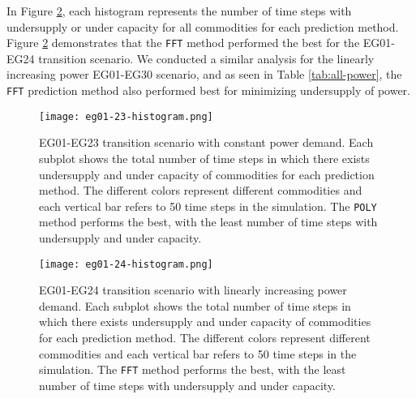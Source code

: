 In Figure \ref{fig:eg24under}, each histogram represents 
the number of time steps with undersupply or 
under capacity for all commodities for each prediction method.  
Figure \ref{fig:eg24under} demonstrates that the \texttt{FFT} method 
performed the best for the EG01-EG24 transition scenario.
We conducted a similar analysis for the linearly increasing power 
EG01-EG30 scenario, and 
as seen in Table \ref{tab:all-power}, the \texttt{FFT} prediction method 
also performed best for minimizing undersupply of power. 

\begin{figure}[]
	\centering
	\texttt{[image: eg01-23-histogram.png]} 
	\caption{
	EG01-EG23 transition scenario with constant power demand. 
	Each subplot shows the total number of time steps in which there exists 
	undersupply and under capacity of commodities for each prediction method. 
	The different colors represent different commodities and each vertical bar refers 
	to 50 time steps in the simulation.
	The \texttt{POLY} method performs the best, with the least number of 
	time steps with undersupply and under capacity.}
	\label{fig:eg23under}
\end{figure}

\begin{figure}[]
	\centering
	\texttt{[image: eg01-24-histogram.png]} 
	\caption{
	EG01-EG24 transition scenario with linearly increasing power demand. 
	Each subplot shows the total number of time steps in which there exists 
	undersupply and under capacity of commodities for each prediction method. 
	The different colors represent different commodities and each vertical bar refers 
	to 50 time steps in the simulation.
	The \texttt{FFT} method performs the best, with the least number of 
	time steps with undersupply and under capacity.}
	\label{fig:eg24under}
\end{figure}

